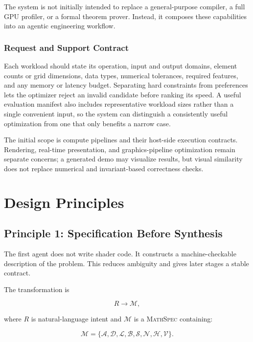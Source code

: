 \documentclass[11pt,a4paper,oneside]{report}
\newcommand{\MathSpec}{\textsc{MathSpec}}
\begin{document}
The system is not initially intended to replace a general-purpose compiler, a full GPU profiler,
or a formal theorem prover. Instead, it composes these capabilities into an agentic engineering
workflow.

\subsection{Request and Support Contract}

Each workload should state its operation, input and output domains, element counts or grid
dimensions, data types, numerical tolerances, required features, and any memory or latency budget.
Separating hard constraints from preferences lets the optimizer reject an invalid candidate before
ranking its speed. A useful evaluation manifest also includes representative workload sizes rather
than a single convenient input, so the system can distinguish a consistently useful optimization
from one that only benefits a narrow case.

The initial scope is compute pipelines and their host-side execution contracts. Rendering,
real-time presentation, and graphics-pipeline optimization remain separate concerns; a generated
demo may visualize results, but visual similarity does not replace numerical and invariant-based
correctness checks.

\chapter{Design Principles}

\section{Principle 1: Specification Before Synthesis}

The first agent does not write shader code. It constructs a machine-checkable description of the
problem. This reduces ambiguity and gives later stages a stable contract.

The transformation is

\[
R \longrightarrow \mathcal{M},
\]

where $R$ is natural-language intent and $\mathcal{M}$ is a \MathSpec{} containing:

\begin{equation}
\mathcal{M} =
\{
\mathcal{A},
\mathcal{D},
\mathcal{L},
\mathcal{B},
\mathcal{S},
\mathcal{N},
\mathcal{H},
\mathcal{V}
\}.
\end{equation}
\end{document}
